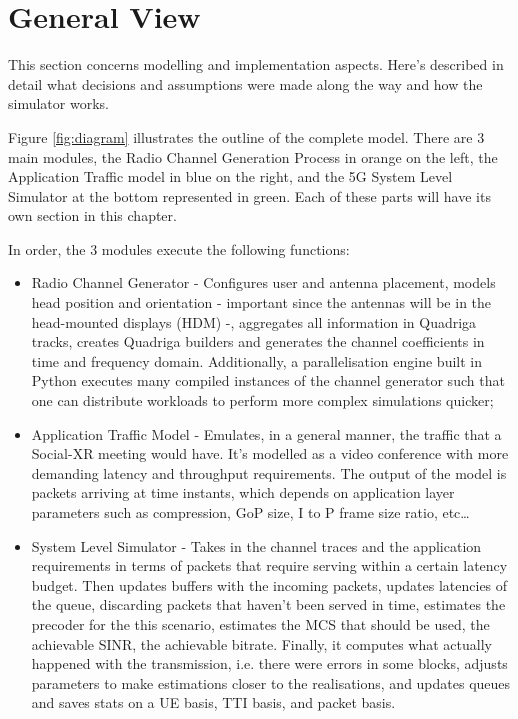 \section{General View}
\label{sec:general_view}

This section concerns modelling and implementation aspects. Here's described in detail what decisions and assumptions were made along the way and how the simulator works.

Figure \ref{fig:diagram} illustrates the outline of the complete model. There are 3 main modules, the Radio Channel Generation Process in orange on the left, the Application Traffic model in blue on the right, and the 5G System Level Simulator at the bottom represented in green. Each of these parts will have its own section in this chapter.



In order, the 3 modules execute the following functions:
\begin{itemize}
    \item Radio Channel Generator - Configures user and antenna placement, models head position and orientation - important since the antennas will be in the head-mounted displays (HDM) -, aggregates all information in Quadriga tracks, creates Quadriga builders and generates the channel coefficients in time and frequency domain. Additionally, a parallelisation engine built in Python executes many compiled instances of the channel generator such that one can distribute workloads to perform more complex simulations quicker;
    \item Application Traffic Model - Emulates, in a general manner, the traffic that a Social-XR meeting would have. It's modelled as a video conference with more demanding latency and throughput requirements. The output of the model is packets arriving at time instants, which depends on application layer parameters such as compression, \ac{GoP} size, I to P frame size ratio, etc\dots
    \item System Level Simulator - Takes in the channel traces and the application requirements in terms of packets that require serving within a certain latency budget. Then updates buffers with the incoming packets, updates latencies of the queue, discarding packets that haven't been served in time, estimates the precoder for the this scenario, estimates the \acs{MCS} that should be used, the achievable SINR, the achievable bitrate. Finally, it computes what actually happened with the transmission, i.e. there were errors in some blocks, adjusts parameters to make estimations closer to the realisations, and updates queues and saves stats on a UE basis, TTI basis, and packet basis.
\end{itemize}